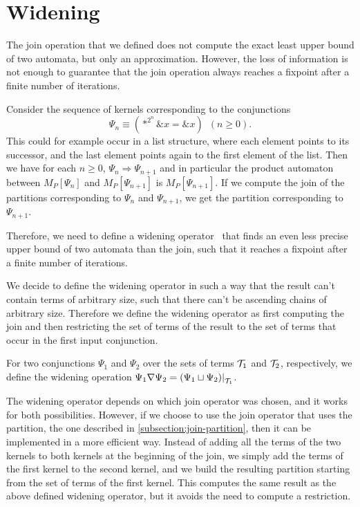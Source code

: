 \section{Widening}

The join operation that we defined does not compute the exact least upper bound of two automata, but only an approximation.
However, the loss of information is not enough to guarantee that the join operation always reaches a fixpoint after a finite number of iterations.

\begin{example}
  Consider the sequence of kernels corresponding to the conjunctions
  \[
    \Psi_n \equiv (*^{2^n} \&x = \&x)\hspace{6pt} (n\geq 0).
  \]
  This could for example occur in a list structure, where each element points to its successor, and the last element points again to the first element of the list.
  Then we have for each $n \geq 0$, $\Psi_n \Longrightarrow \Psi_{n+1}$ and in particular the product automaton between $M_P[\Psi_n]$ and $M_P[\Psi_{n+1}]$ is $M_P[\Psi_{n+1}]$.
  If we compute the join of the partitions corresponding to $\Psi_n$ and $\Psi_{n+1}$, we get the partition corresponding to $\Psi_{n+1}$.\cite{2pointer}
\end{example}

Therefore, we need to define a widening operator~\cite{widening} that finds an even less precise upper bound of two automata than the join, such that it reaches a fixpoint after a finite number of iterations.

We decide to define the widening operator in such a way that the result can't contain terms of arbitrary size, such that there can't be ascending chains of arbitrary size. Therefore we define the widening operator as first computing the join and then restricting the set of terms of the result to the set of terms that occur in the first input conjunction.

\begin{definition}
  For two conjunctions $\Psi_1$ and $\Psi_2$ over the sets of terms $\mathcal{T}_1$ and $\mathcal{T}_2$, respectively, we define the widening operation
  $\Psi_1 \widen \Psi_2 = \restr{(\Psi_1 \join \Psi_2)}{\T_1}$.
\end{definition}

The widening operator depends on which join operator was chosen, and it
works for both possibilities.
However, if we choose to use the join operator that uses the partition, the one described in \cref{subsection:join-partition},
then it can be implemented in a more efficient way.
Instead of adding all the terms of the two kernels to both kernels at the beginning of the join,
we simply add the terms of the first kernel to the second kernel,
and we build the resulting partition starting from the set of terms of the first kernel.
This computes the same result as the above defined widening operator,
but it avoids the need to compute a restriction.

